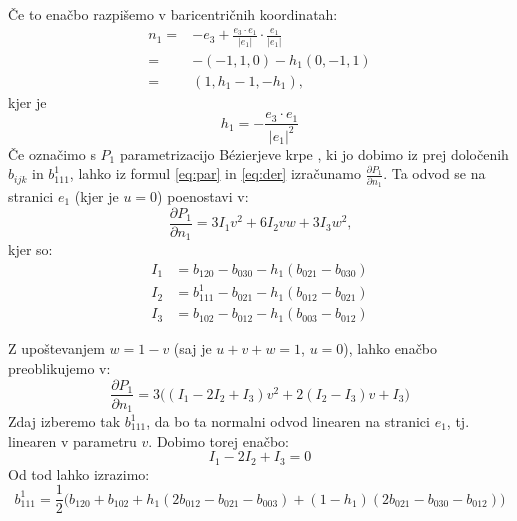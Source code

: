 \documentclass[ letterpaper, titlepage, fleqn]{article}
\begin{document}
{\begin{figure}[h]
	\end{figure}
	
Če to enačbo razpišemo v baricentričnih koordinatah:
\[
\begin{split}
	n_1 =& -e_3 + \frac{e_3 \cdot e_1}{\lvert e_1 \rvert} \cdot  \frac{e_1}{\lvert e_1 \rvert}\\
		=& -(-1,1,0) - h_1 (0,-1,1) \\
		=& (1,h_1-1,-h_1) \text{,}
\end{split}
\]
kjer je
$$h_1 = -  \frac{e_3 \cdot e_1}{\lvert e_1 \rvert^2}$$
Če označimo s $P_1$ parametrizacijo Bézierjeve krpe , ki jo dobimo iz prej določenih $b_{ijk}$ in $b_{111}^1$, lahko iz formul \ref{eq:par} in \ref{eq:der} izračunamo $\frac{\partial{P_1}}{\partial{n_1}}$. Ta odvod se na stranici $e_1$ (kjer je $u=0$) poenostavi v:
$$\frac{\partial{P_1}}{\partial{n_1}} = 3I_1 v^2 + 6 I_2 vw + 3I_3 w^2 \text{,}$$
kjer so:
\[
\begin{split}
	I_1 &= b_{120}-b_{030}-h_1(b_{021}-b_{030})\\
	I_2 &= b_{111}^1-b_{021}-h_1(b_{012}-b_{021})\\
	I_3 &= b_{102}-b_{012}-h_1(b_{003}-b_{012})
\end{split}
\]

Z upoštevanjem $w=1-v$ (saj je $u+v+w=1$, $u=0$), lahko enačbo preoblikujemo v:
$$\frac{\partial{P_1}}{\partial{n_1}} = 3\bigg((I_1-2I_2+I_3) v^2 + 2 (I_2-I_3) v + I_3 \bigg)$$
Zdaj izberemo tak $b_{111}^1$, da bo ta normalni odvod linearen na stranici $e_1$, tj. linearen v parametru $v$. Dobimo torej enačbo:
$$I_1-2I_2+I_3 = 0$$
Od tod lahko izrazimo:
$$b_{111}^1 = \frac{1}{2}\bigg(b_{120}+b_{102}+h_1(2b_{012}-b_{021}-b_{003}) +(1-h_1)(2b_{021}-b_{030}-b_{012})\bigg)$$

}
\end{document}
